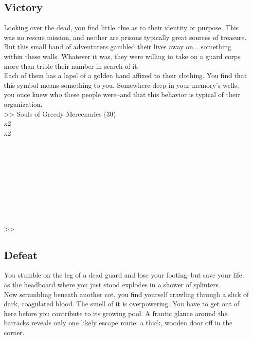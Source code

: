 \pagebreak

\subsection*{Victory}
Looking over the dead, you find little clue as to their identity or purpose. This was no rescue mission, and neither are prisons typically great sources of treasure. But this small band of adventurers gambled their lives away on... something within these walls. Whatever it was, they were willing to take on a guard corps more than triple their number in search of it.\\

Each of them has a lapel of a golden hand affixed to their clothing. You find that this symbol means something to you. Somewhere deep in your memory’s wells, you once knew who these people were--and that this behavior is typical of their organization.\\

>> Souls of Greedy Mercenaries (30)\\
 x2\\
 x2\\
\\
\\
\\
\\
\\
\\
\\
\\
\\
>> 

\subsection*{Defeat}
You stumble on the leg of a dead guard and lose your footing--but save your life, as the headboard where you just stood explodes in a shower of splinters.\\

Now scrambling beneath another cot, you find yourself crawling through a slick of dark, coagulated blood. The smell of it is overpowering. You have to get out of here before you contribute to its growing pool. A frantic glance around the barracks reveals only one likely escape route: a thick, wooden door off in the corner.\\

